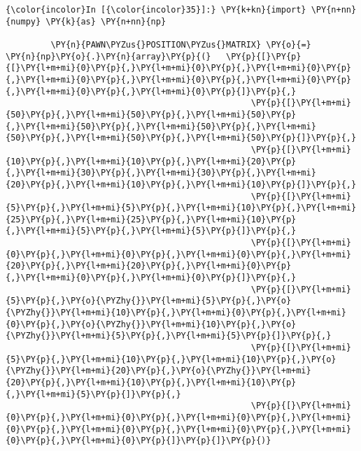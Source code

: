     \begin{Verbatim}[commandchars=\\\{\}]
{\color{incolor}In [{\color{incolor}35}]:} \PY{k+kn}{import} \PY{n+nn}{numpy} \PY{k}{as} \PY{n+nn}{np}
         
         \PY{n}{PAWN\PYZus{}POSITION\PYZus{}MATRIX} \PY{o}{=}      \PY{n}{np}\PY{o}{.}\PY{n}{array}\PY{p}{(}   \PY{p}{[}\PY{p}{[}\PY{l+m+mi}{0}\PY{p}{,}\PY{l+m+mi}{0}\PY{p}{,}\PY{l+m+mi}{0}\PY{p}{,}\PY{l+m+mi}{0}\PY{p}{,}\PY{l+m+mi}{0}\PY{p}{,}\PY{l+m+mi}{0}\PY{p}{,}\PY{l+m+mi}{0}\PY{p}{,}\PY{l+m+mi}{0}\PY{p}{]}\PY{p}{,}
                                                 \PY{p}{[}\PY{l+m+mi}{50}\PY{p}{,}\PY{l+m+mi}{50}\PY{p}{,}\PY{l+m+mi}{50}\PY{p}{,}\PY{l+m+mi}{50}\PY{p}{,}\PY{l+m+mi}{50}\PY{p}{,}\PY{l+m+mi}{50}\PY{p}{,}\PY{l+m+mi}{50}\PY{p}{,}\PY{l+m+mi}{50}\PY{p}{]}\PY{p}{,}
                                                 \PY{p}{[}\PY{l+m+mi}{10}\PY{p}{,}\PY{l+m+mi}{10}\PY{p}{,}\PY{l+m+mi}{20}\PY{p}{,}\PY{l+m+mi}{30}\PY{p}{,}\PY{l+m+mi}{30}\PY{p}{,}\PY{l+m+mi}{20}\PY{p}{,}\PY{l+m+mi}{10}\PY{p}{,}\PY{l+m+mi}{10}\PY{p}{]}\PY{p}{,}
                                                 \PY{p}{[}\PY{l+m+mi}{5}\PY{p}{,}\PY{l+m+mi}{5}\PY{p}{,}\PY{l+m+mi}{10}\PY{p}{,}\PY{l+m+mi}{25}\PY{p}{,}\PY{l+m+mi}{25}\PY{p}{,}\PY{l+m+mi}{10}\PY{p}{,}\PY{l+m+mi}{5}\PY{p}{,}\PY{l+m+mi}{5}\PY{p}{]}\PY{p}{,}
                                                 \PY{p}{[}\PY{l+m+mi}{0}\PY{p}{,}\PY{l+m+mi}{0}\PY{p}{,}\PY{l+m+mi}{0}\PY{p}{,}\PY{l+m+mi}{20}\PY{p}{,}\PY{l+m+mi}{20}\PY{p}{,}\PY{l+m+mi}{0}\PY{p}{,}\PY{l+m+mi}{0}\PY{p}{,}\PY{l+m+mi}{0}\PY{p}{]}\PY{p}{,}
                                                 \PY{p}{[}\PY{l+m+mi}{5}\PY{p}{,}\PY{o}{\PYZhy{}}\PY{l+m+mi}{5}\PY{p}{,}\PY{o}{\PYZhy{}}\PY{l+m+mi}{10}\PY{p}{,}\PY{l+m+mi}{0}\PY{p}{,}\PY{l+m+mi}{0}\PY{p}{,}\PY{o}{\PYZhy{}}\PY{l+m+mi}{10}\PY{p}{,}\PY{o}{\PYZhy{}}\PY{l+m+mi}{5}\PY{p}{,}\PY{l+m+mi}{5}\PY{p}{]}\PY{p}{,}
                                                 \PY{p}{[}\PY{l+m+mi}{5}\PY{p}{,}\PY{l+m+mi}{10}\PY{p}{,}\PY{l+m+mi}{10}\PY{p}{,}\PY{o}{\PYZhy{}}\PY{l+m+mi}{20}\PY{p}{,}\PY{o}{\PYZhy{}}\PY{l+m+mi}{20}\PY{p}{,}\PY{l+m+mi}{10}\PY{p}{,}\PY{l+m+mi}{10}\PY{p}{,}\PY{l+m+mi}{5}\PY{p}{]}\PY{p}{,}
                                                 \PY{p}{[}\PY{l+m+mi}{0}\PY{p}{,}\PY{l+m+mi}{0}\PY{p}{,}\PY{l+m+mi}{0}\PY{p}{,}\PY{l+m+mi}{0}\PY{p}{,}\PY{l+m+mi}{0}\PY{p}{,}\PY{l+m+mi}{0}\PY{p}{,}\PY{l+m+mi}{0}\PY{p}{,}\PY{l+m+mi}{0}\PY{p}{]}\PY{p}{]}\PY{p}{)}
         

\end{Verbatim}

